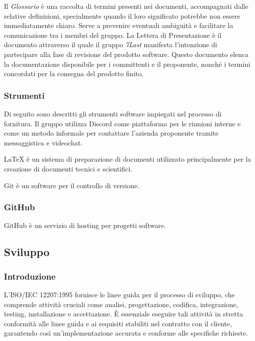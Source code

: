 Il \textit{Glossario} è una raccolta di termini presenti nei documenti, accompagnati dalle relative definizioni, specialmente quando il loro significato potrebbe non essere immediatamente chiaro.
Serve a prevenire eventuali ambiguità e facilitare la comunicazione tra i membri del gruppo.
La Lettera di Presentazione è il documento attraverso il quale il gruppo \textit{7Last} manifesta l'intenzione di partecipare alla fase di revisione del prodotto software.
Questo documento elenca la documentazione disponibile per i committenti e il proponente, nonché i termini concordati per la consegna del prodotto finito.


\subsubsection{Strumenti}
Di seguito sono descritti gli strumenti software impiegati nel processo di fornitura.
Il gruppo utilizza Discord come piattaforma per le riunioni interne e come un metodo informale per contattare l'azienda proponente tramite messaggistica e videochat.

LaTeX è un sistema di preparazione di documenti utilizzato principalmente per la creazione di documenti tecnici e scientifici.

Git è un software per il controllo di versione.

\subsubsection{GitHub}
GitHub è un servizio di hosting per progetti software.

\subsection{Sviluppo}
\subsubsection{Introduzione}
L'ISO/IEC 12207:1995 fornisce le linee guida per il processo di sviluppo, che comprende attività cruciali come analisi, progettazione, codifica, integrazione, testing, installazione e accettazione.
È essenziale eseguire tali attività in stretta conformità alle linee guida e ai requisiti stabiliti nel contratto con il cliente, garantendo così un'implementazione accurata e conforme alle specifiche richieste.
